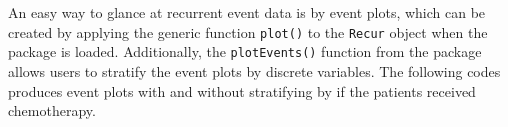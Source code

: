 An easy way to glance at recurrent event data is by event plots, which
can be created by applying the generic function \texttt{plot()} to the
\texttt{Recur} object when the  package is loaded.
Additionally, the \texttt{plotEvents()} function from the 
package allows users to stratify the event plots by discrete variables.
The following codes produces event plots with and without stratifying by
if the patients received chemotherapy.

\begin{Shaded}
\end{Shaded}

